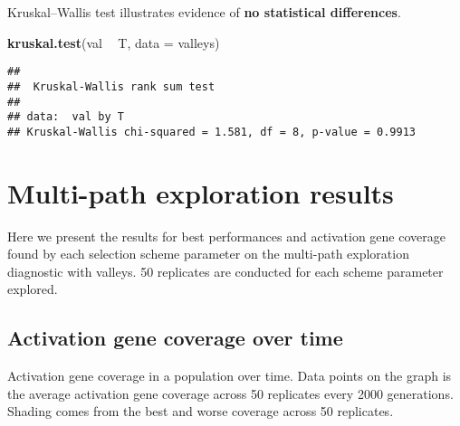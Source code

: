 \documentclass[]{book}
\newenvironment{Shaded}{\begin{snugshade}}{\end{snugshade}}
\newcommand{\DataTypeTok}[1]{\textcolor[rgb]{0.13,0.29,0.53}{#1}}
\newcommand{\KeywordTok}[1]{\textcolor[rgb]{0.13,0.29,0.53}{\textbf{#1}}}
\newcommand{\NormalTok}[1]{#1}
\newcommand{\OperatorTok}[1]{\textcolor[rgb]{0.81,0.36,0.00}{\textbf{#1}}}
\newcommand{\StringTok}[1]{\textcolor[rgb]{0.31,0.60,0.02}{#1}}
\begin{document}
Kruskal--Wallis test illustrates evidence of \textbf{no statistical differences}.

\begin{Shaded}
\begin{Highlighting}[]
\KeywordTok{kruskal.test}\NormalTok{(val }\OperatorTok{~}\StringTok{ }\NormalTok{T, }\DataTypeTok{data =}\NormalTok{ valleys)}
\end{Highlighting}
\end{Shaded}

\begin{verbatim}
## 
##  Kruskal-Wallis rank sum test
## 
## data:  val by T
## Kruskal-Wallis chi-squared = 1.581, df = 8, p-value = 0.9913
\end{verbatim}

\hypertarget{multi-path-exploration-results}{%
\section{Multi-path exploration results}\label{multi-path-exploration-results}}

Here we present the results for best performances and activation gene coverage found by each selection scheme parameter on the multi-path exploration diagnostic with valleys.
50 replicates are conducted for each scheme parameter explored.

\hypertarget{activation-gene-coverage-over-time-1}{%
\subsection{Activation gene coverage over time}\label{activation-gene-coverage-over-time-1}}

Activation gene coverage in a population over time.
Data points on the graph is the average activation gene coverage across 50 replicates every 2000 generations.
Shading comes from the best and worse coverage across 50 replicates.

\begin{Shaded}
\end{Shaded}
\end{document}
